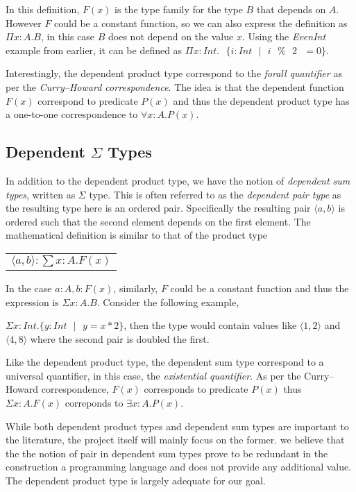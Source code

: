 \documentclass[a4paper,12pt]{report}
\begin{document}
In this definition, $F(x)$ is the type family for the type $B$ that depends on $A$.
However $F$ could be a constant function, so we can also express the definition 
as $\Pi x:A.B$, in this case $B$ does not depend 
on the value $x$. Using the \textit{EvenInt} example from earlier, 
it can be defined as 
$\Pi x:Int.\text{ }\{ i:Int\text{ }|\text{ }i\text{ }\%\text{ }2\text{ }= 0\}$.

\par
Interestingly, the dependent product type correspond to the 
\textit{forall quantifier} as per 
the \textit{Curry–Howard correspondence}. The idea is that the dependent 
function $F(x)$ correspond to predicate $P(x)$ and thus the dependent product 
type has a one-to-one correspondence to $\forall x: A. P(x)$.

\subsection{Dependent $\Sigma$ Types}
In addition to the dependent product type, we have the notion of \textit{dependent sum 
types}, written as $\Sigma$ type. This is often referred to as the 
\textit{dependent pair type} as the resulting type here is an ordered pair. 
Specifically the resulting pair $\langle a,b \rangle$ is ordered such that the 
second element depends on the first element. The 
mathematical definition is similar to that of the product type
\begin{center}
 \begin{tabular}{l}
   $\langle a,b \rangle :\sum x: A.  F(x)$
 \end{tabular} 
\end{center}
In the case $a:A, b: F(x)$, similarly, $F$ could be a constant function and thus 
the expression is $\Sigma x:A.B$. Consider the following example, 

$\Sigma x: Int.\{y:Int\text{ }|\text{ } y = x * 2\}$, then the type would 
contain values like $\langle 1,2 \rangle$ and $\langle 4,8 \rangle$ where the 
second pair is doubled the first.

\par
Like the dependent product type, the dependent sum type correspond to a 
universal quantifier, in this case, the \textit{existential quantifier}. As 
per the Curry–Howard correspondence, $F(x)$ corresponds to predicate $P(x)$ 
thus $\Sigma x:A.F(x)$ correponds to $\exists x: A. P(x)$.

\par
While both dependent product types and dependent sum types are important to the 
literature, the project itself will mainly focus on the former. we believe that 
the the notion of pair in dependent sum types prove to be redundant in 
the construction a programming language and does not provide any additional 
value. The dependent product type is largely adequate for our goal.
\end{document}

